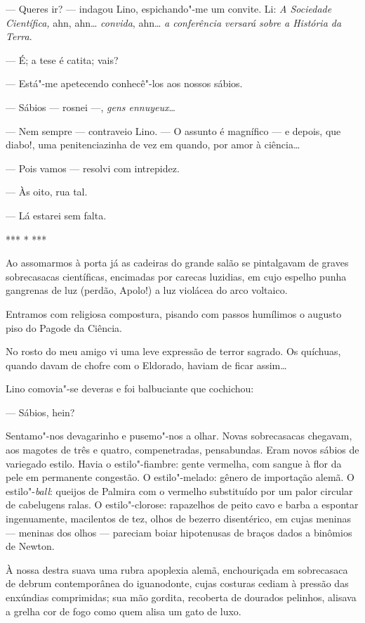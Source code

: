 --- Queres ir? --- indagou Lino, espichando"-me um convite. Li: \emph{A
Sociedade Científica,} ahn, ahn\ldots{} \emph{convida}, ahn\ldots{} \emph{a
conferência versará sobre a História da Terra}.

--- É; a tese é catita; vais?

--- Está"-me apetecendo conhecê"-los aos nossos sábios.

--- Sábios --- rosnei ---, \emph{gens ennuyeux}\ldots{}

--- Nem sempre --- contraveio Lino. --- O assunto é magnífico --- e
depois, que diabo!, uma penitenciazinha de vez em quando, por amor à
ciência\ldots{}

--- Pois vamos --- resolvi com intrepidez.

--- Às oito, rua tal.

--- Lá estarei sem falta.

*** * ***

Ao assomarmos à porta já as cadeiras do grande salão se pintalgavam de
graves sobrecasacas científicas, encimadas por carecas luzidias, em cujo
espelho punha gangrenas de luz (perdão, Apolo!) a luz violácea do arco
voltaico.

Entramos com religiosa compostura, pisando com passos humílimos o
augusto piso do Pagode da Ciência.

No rosto do meu amigo vi uma leve expressão de terror sagrado. Os
quíchuas, quando davam de chofre com o Eldorado, haviam de ficar
assim\ldots{}

Lino comovia"-se deveras e foi balbuciante que cochichou:

--- Sábios, hein?

Sentamo"-nos devagarinho e pusemo"-nos a olhar. Novas sobrecasacas
chegavam, aos magotes de três e quatro, compenetradas, pensabundas. Eram
novos sábios de variegado estilo. Havia o estilo"-fiambre: gente
vermelha, com sangue à flor da pele em permanente congestão. O
estilo"-melado: gênero de importação alemã. O estilo"-\emph{ball}: queijos
de Palmira com o vermelho substituído por um palor circular de
cabelugens ralas. O estilo"-clorose: rapazelhos de peito cavo e barba a
espontar ingenuamente, macilentos de tez, olhos de bezerro disentérico,
em cujas meninas --- meninas dos olhos --- pareciam boiar hipotenusas de
braços dados a binômios de Newton.

À nossa destra suava uma rubra apoplexia alemã, enchouriçada em
sobrecasaca de debrum contemporânea do iguanodonte, cujas costuras
cediam à pressão das enxúndias comprimidas; sua mão gordita, recoberta
de dourados pelinhos, alisava a grelha cor de fogo como quem alisa um
gato de luxo.

